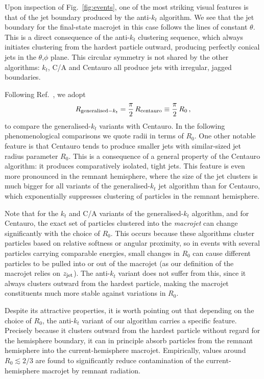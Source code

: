 Upon inspection of Fig.~\ref{fig:events}, one of the most striking visual features is that of the jet boundary produced by the anti-$k_t$ algorithm.
%
We see that the jet boundary for the final-state macrojet in this case follows the lines of constant $\theta$.
%
This is a direct consequence of the anti-$k_t$ clustering sequence, which always initiates clustering from the hardest particle outward, producing perfectly conical jets in the $\theta$,$\phi$ plane. 
%
This circular symmetry is not shared by the other algorithms: $k_t$, C/A and Centauro all produce jets with irregular, jagged boundaries.

Following Ref.~\cite{Arratia:2020ssx}, we adopt 
\begin{align}
\label{eq:R-comp}
R_{{\rm generalised}-k_t} = \frac{\pi}{2} \, R_{\rm centauro} \equiv  \frac{\pi}{2} \, R_0\,,
\end{align}
to compare the generalised-$k_t$ variants with Centauro. In the following phenomenological comparisons we quote radii in terms of $R_0$.
%
One other notable feature is that Centauro tends to produce smaller jets with similar-sized jet radius parameter $R_0$.
%
This is a consequence of a general property of the Centauro algorithm: it produces comparatively isolated, tight jets. 
%
This feature is even more pronounced in the remnant hemisphere, where
the size of the jet clusters is much bigger for all variants of the
generalised-$k_t$ jet algorithm than for Centauro, which exponentially
suppresses clustering of particles in the remnant hemisphere.

Note that for the $k_t$ and C/A variants of the generalised-$k_t$ algorithm, and for Centauro, the exact set of particles clustered into the \emph{macrojet} can change significantly with the choice of $R_0$. 
%
This occurs because these algorithms cluster particles based on relative softness or angular proximity, so in events with several particles carrying comparable energies, small changes in $R_0$ can cause different particles to be pulled into or out of the macrojet (as our definition of the macrojet relies on $z_{\rm jet}$). 
%
The anti-$k_t$ variant does not suffer from this, since it always clusters outward from the hardest particle, making the macrojet constituents much more stable against variations in $R_0$. 

Despite its attractive properties, it is worth pointing out that depending on the choice of $R_0$, the anti-$k_t$ variant of our algorithm carries a specific feature. 
%
Precisely because it clusters outward from the hardest particle without regard for the hemisphere boundary, it can in principle absorb particles from the remnant hemisphere into the current-hemisphere macrojet. 
%
Empirically, values around $R_0\lesssim 2/3$ are found to significantly reduce contamination of the current-hemisphere macrojet by remnant radiation.

